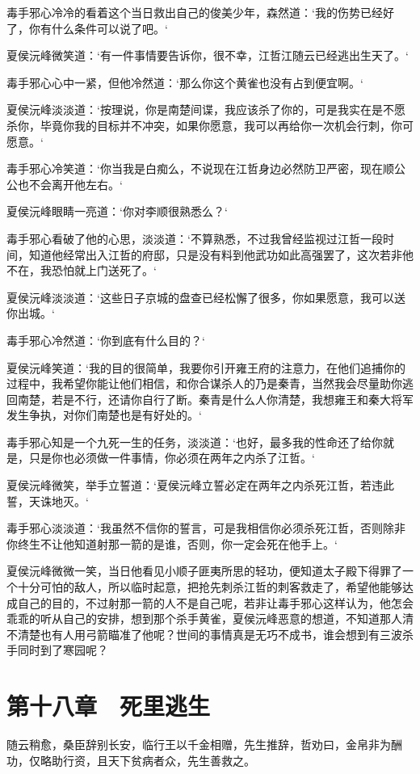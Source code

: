 毒手邪心冷冷的看着这个当日救出自己的俊美少年，森然道：‘我的伤势已经好了，你有什么条件可以说了吧。‘

夏侯沅峰微笑道：‘有一件事情要告诉你，很不幸，江哲江随云已经逃出生天了。‘

毒手邪心心中一紧，但他冷然道：‘那么你这个黄雀也没有占到便宜啊。‘

夏侯沅峰淡淡道：‘按理说，你是南楚间谍，我应该杀了你的，可是我实在是不愿杀你，毕竟你我的目标并不冲突，如果你愿意，我可以再给你一次机会行刺，你可愿意。‘

毒手邪心冷笑道：‘你当我是白痴么，不说现在江哲身边必然防卫严密，现在顺公公也不会离开他左右。‘

夏侯沅峰眼睛一亮道：‘你对李顺很熟悉么？‘

毒手邪心看破了他的心思，淡淡道：‘不算熟悉，不过我曾经监视过江哲一段时间，知道他经常出入江哲的府邸，只是没有料到他武功如此高强罢了，这次若非他不在，我恐怕就上门送死了。‘

夏侯沅峰淡淡道：‘这些日子京城的盘查已经松懈了很多，你如果愿意，我可以送你出城。‘

毒手邪心冷然道：‘你到底有什么目的？‘

夏侯沅峰笑道：‘我的目的很简单，我要你引开雍王府的注意力，在他们追捕你的过程中，我希望你能让他们相信，和你合谋杀人的乃是秦青，当然我会尽量助你逃回南楚，若是不行，还请你自行了断。秦青是什么人你清楚，我想雍王和秦大将军发生争执，对你们南楚也是有好处的。‘

毒手邪心知是一个九死一生的任务，淡淡道：‘也好，最多我的性命还了给你就是，只是你也必须做一件事情，你必须在两年之内杀了江哲。‘

夏侯沅峰微笑，举手立誓道：‘夏侯沅峰立誓必定在两年之内杀死江哲，若违此誓，天诛地灭。‘

毒手邪心淡淡道：‘我虽然不信你的誓言，可是我相信你必须杀死江哲，否则除非你终生不让他知道射那一箭的是谁，否则，你一定会死在他手上。‘

夏侯沅峰微微一笑，当日他看见小顺子匪夷所思的轻功，便知道太子殿下得罪了一个十分可怕的敌人，所以临时起意，把抢先刺杀江哲的刺客救走了，希望他能够达成自己的目的，不过射那一箭的人不是自己呢，若非让毒手邪心这样认为，他怎会乖乖的听从自己的安排，想到那个杀手黄雀，夏侯沅峰恶意的想道，不知道那人清不清楚也有人用弓箭瞄准了他呢？世间的事情真是无巧不成书，谁会想到有三波杀手同时到了寒园呢？

\chapter{第十八章　死里逃生}

随云稍愈，桑臣辞别长安，临行王以千金相赠，先生推辞，哲劝曰，金帛非为酬功，仅略助行资，且天下贫病者众，先生善救之。

